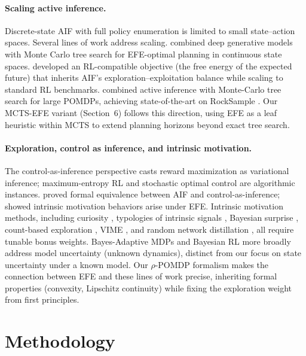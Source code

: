 \documentclass{article}
\begin{document}
\paragraph{Scaling active inference.}
Discrete-state AIF with full policy enumeration is limited to small state--action spaces. Several lines of work address scaling. \citet{fountas2020} combined deep generative models with Monte Carlo tree search for EFE-optimal planning in continuous state spaces. \citet{tschantz2020} developed an RL-compatible objective (the free energy of the expected future) that inherits AIF's exploration--exploitation balance while scaling to standard RL benchmarks. \citet{maisto2025} combined active inference with Monte-Carlo tree search for large POMDPs, achieving state-of-the-art on RockSample \citep{smith2004}. Our MCTS-EFE variant (Section~6) follows this direction, using EFE as a leaf heuristic within MCTS to extend planning horizons beyond exact tree search.

\paragraph{Exploration, control as inference, and intrinsic motivation.}
The control-as-inference perspective \citep{todorov2007, levine2018} casts reward maximization as variational inference; maximum-entropy RL \citep{haarnoja2018} and stochastic optimal control \citep{rawlik2012} are algorithmic instances. \citet{millidge2020} proved formal equivalence between AIF and control-as-inference; \citet{sajid2021} showed intrinsic motivation behaviors arise under EFE. Intrinsic motivation methods, including curiosity \citep{schmidhuber1991, pathak2017}, typologies of intrinsic signals \citep{oudeyer2007}, Bayesian surprise \citep{itti2009}, count-based exploration \citep{bellemare2016}, VIME \citep{houthooft2016}, and random network distillation \citep{burda2019}, all require tunable bonus weights. Bayes-Adaptive MDPs \citep{duff2002, guez2013} and Bayesian RL more broadly \citep{ghavamzadeh2015} address model uncertainty (unknown dynamics), distinct from our focus on state uncertainty under a known model. Our $\rho$-POMDP formalism makes the connection between EFE and these lines of work precise, inheriting formal properties (convexity, Lipschitz continuity) while fixing the exploration weight from first principles.

\section{Methodology}
\label{sec:methodology}
\end{document}
